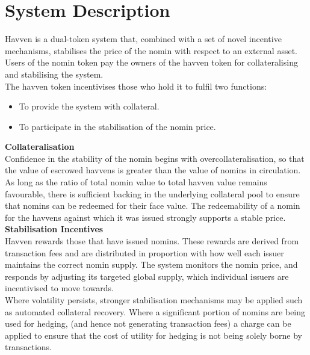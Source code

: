 \section{System Description} Havven is a dual-token system that, combined with a set of novel incentive mechanisms, stabilises the price of the nomin with respect to an external asset. Users of the nomin token pay the owners of the havven token for collateralising and stabilising the system. \\

\noindent The havven token incentivises those who hold it to fulfil two functions:

\begin{itemize}
\item{To provide the system with collateral.}
\item{To participate in the stabilisation of the nomin price.} \\
\end{itemize}

\noindent \textbf{Collateralisation} \\

\noindent Confidence in the stability of the nomin begins with overcollateralisation, so that the value of escrowed havvens is greater than the value of nomins in circulation. As long as the ratio of total nomin value to total havven value remains favourable, there is sufficient backing in the underlying collateral pool to ensure that nomins
can be redeemed for their face value. The redeemability of a nomin for the havvens against which it was issued strongly supports a stable price. \\

\noindent \textbf{Stabilisation Incentives} \\

\noindent Havven rewards those that have issued nomins. These rewards are derived from transaction fees and are distributed in proportion with how well each issuer maintains the correct nomin supply. The system monitors the nomin price, and responds by adjusting its targeted global supply, which individual issuers are incentivised to move towards. \\

\noindent Where volatility persists, stronger stabilisation mechanisms may be applied such as automated collateral recovery. Where a significant portion of nomins are being used for hedging, (and hence not generating transaction fees) a charge can be applied to ensure that the cost of utility for hedging is not being solely borne by transactions.

